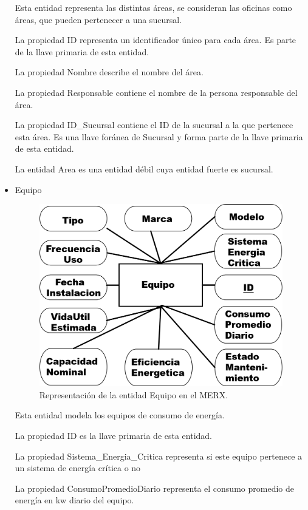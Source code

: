 \documentclass{article}
\begin{document}
\begin{itemize}
Esta entidad representa las distintas áreas, se consideran las oficinas como áreas, que pueden pertenecer a una sucursal.

La propiedad ID representa un identificador único para cada área. Es parte de la llave primaria de esta entidad.

La propiedad Nombre describe el nombre del área.

La propiedad Responsable contiene el nombre de la persona responsable del área.

La propiedad ID\_Sucursal contiene el ID de la sucursal a la que pertenece esta área. Es una llave foránea  de Sucursal y forma parte de la llave primaria de esta entidad.

La entidad Area es una entidad débil cuya entidad fuerte es sucursal.
\item Equipo

\begin{figure}
\includegraphics[scale=0.5]{Imagenes/Informe1/EntidadEquipo.png}
\caption{Representación de la entidad Equipo en el MERX.}
\label{entidadEquipo}
\end{figure}

Esta entidad modela los equipos de consumo de energía.

La propiedad ID es la llave primaria de esta entidad.

La propiedad Sistema\_Energia\_Critica representa si este equipo pertenece a un sistema de energía crítica o no

La propiedad ConsumoPromedioDiario representa el consumo promedio de energía en kw diario del equipo.


\end{itemize}
\end{document}

